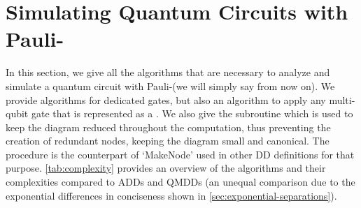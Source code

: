 \section{Simulating Quantum Circuits with Pauli-\limdds}
\label{sec:quantum-simulation}

%

In this section, we give all the algorithms that are necessary to analyze and simulate a quantum circuit with Pauli-\limdds (we will simply say \limdd from now on).
We provide algorithms for dedicated gates, but also an algorithm to apply any multi-qubit gate that is represented as a \limdd.
We also give the subroutine \makeedge which is used to keep the diagram reduced throughout the computation, thus preventing the creation of redundant nodes, keeping the diagram small and canonical. The procedure is the counterpart of `MakeNode' used in other DD definitions for that purpose.
\autoref{tab:complexity} provides an overview of the \limdd algorithms and their 
complexities compared to ADDs and QMDDs (an unequal comparison due to the exponential differences in conciseness shown in \autoref{sec:exponential-separations}).


